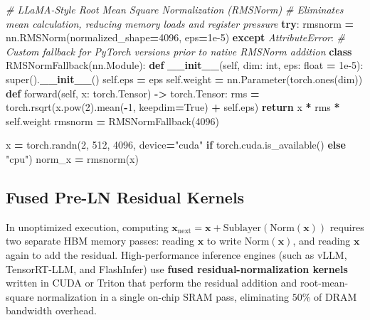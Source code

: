 \documentclass[
  letterpaper,
]{scrbook}
\newenvironment{Shaded}{\begin{snugshade}}{\end{snugshade}}
\newcommand{\BuiltInTok}[1]{#1}
\newcommand{\CommentTok}[1]{\textcolor[rgb]{0.56,0.35,0.01}{\textit{#1}}}
\newcommand{\ControlFlowTok}[1]{\textcolor[rgb]{0.13,0.29,0.53}{\textbf{#1}}}
\newcommand{\DecValTok}[1]{\textcolor[rgb]{0.00,0.00,0.81}{#1}}
\newcommand{\FloatTok}[1]{\textcolor[rgb]{0.00,0.00,0.81}{#1}}
\newcommand{\FunctionTok}[1]{\textcolor[rgb]{0.13,0.29,0.53}{\textbf{#1}}}
\newcommand{\KeywordTok}[1]{\textcolor[rgb]{0.13,0.29,0.53}{\textbf{#1}}}
\newcommand{\NormalTok}[1]{#1}
\newcommand{\OperatorTok}[1]{\textcolor[rgb]{0.81,0.36,0.00}{\textbf{#1}}}
\newcommand{\PreprocessorTok}[1]{\textcolor[rgb]{0.56,0.35,0.01}{\textit{#1}}}
\newcommand{\StringTok}[1]{\textcolor[rgb]{0.31,0.60,0.02}{#1}}
\newcommand{\VariableTok}[1]{\textcolor[rgb]{0.00,0.00,0.00}{#1}}
\begin{document}
\begin{tcolorbox}
\begin{Shaded}
\begin{Highlighting}[]
\CommentTok{\# LLaMA{-}Style Root Mean Square Normalization (RMSNorm)}
\CommentTok{\# Eliminates mean calculation, reducing memory loads and register pressure}
\ControlFlowTok{try}\NormalTok{:}
\NormalTok{    rmsnorm }\OperatorTok{=}\NormalTok{ nn.RMSNorm(normalized\_shape}\OperatorTok{=}\DecValTok{4096}\NormalTok{, eps}\OperatorTok{=}\FloatTok{1e{-}5}\NormalTok{)}
\ControlFlowTok{except} \PreprocessorTok{AttributeError}\NormalTok{:}
    \CommentTok{\# Custom fallback for PyTorch versions prior to native RMSNorm addition}
    \KeywordTok{class}\NormalTok{ RMSNormFallback(nn.Module):}
        \KeywordTok{def} \FunctionTok{\_\_init\_\_}\NormalTok{(}\VariableTok{self}\NormalTok{, dim: }\BuiltInTok{int}\NormalTok{, eps: }\BuiltInTok{float} \OperatorTok{=} \FloatTok{1e{-}5}\NormalTok{):}
            \BuiltInTok{super}\NormalTok{().}\FunctionTok{\_\_init\_\_}\NormalTok{()}
            \VariableTok{self}\NormalTok{.eps }\OperatorTok{=}\NormalTok{ eps}
            \VariableTok{self}\NormalTok{.weight }\OperatorTok{=}\NormalTok{ nn.Parameter(torch.ones(dim))}
        \KeywordTok{def}\NormalTok{ forward(}\VariableTok{self}\NormalTok{, x: torch.Tensor) }\OperatorTok{{-}\textgreater{}}\NormalTok{ torch.Tensor:}
\NormalTok{            rms }\OperatorTok{=}\NormalTok{ torch.rsqrt(x.}\BuiltInTok{pow}\NormalTok{(}\DecValTok{2}\NormalTok{).mean(}\OperatorTok{{-}}\DecValTok{1}\NormalTok{, keepdim}\OperatorTok{=}\VariableTok{True}\NormalTok{) }\OperatorTok{+} \VariableTok{self}\NormalTok{.eps)}
            \ControlFlowTok{return}\NormalTok{ x }\OperatorTok{*}\NormalTok{ rms }\OperatorTok{*} \VariableTok{self}\NormalTok{.weight}
\NormalTok{    rmsnorm }\OperatorTok{=}\NormalTok{ RMSNormFallback(}\DecValTok{4096}\NormalTok{)}

\NormalTok{x }\OperatorTok{=}\NormalTok{ torch.randn(}\DecValTok{2}\NormalTok{, }\DecValTok{512}\NormalTok{, }\DecValTok{4096}\NormalTok{, device}\OperatorTok{=}\StringTok{"cuda"} \ControlFlowTok{if}\NormalTok{ torch.cuda.is\_available() }\ControlFlowTok{else} \StringTok{"cpu"}\NormalTok{)}
\NormalTok{norm\_x }\OperatorTok{=}\NormalTok{ rmsnorm(x)}
\end{Highlighting}
\end{Shaded}

\subsection{Fused Pre-LN Residual
Kernels}\label{fused-pre-ln-residual-kernels}

In unoptimized execution, computing
\(\mathbf{x}_{\text{next}} = \mathbf{x} + \text{Sublayer}(\text{Norm}(\mathbf{x}))\)
requires two separate HBM memory passes: reading \(\mathbf{x}\) to write
\(\text{Norm}(\mathbf{x})\), and reading \(\mathbf{x}\) again to add the
residual. High-performance inference engines (such as vLLM,
TensorRT-LLM, and FlashInfer) use \textbf{fused residual-normalization
kernels} written in CUDA or Triton that perform the residual addition
and root-mean-square normalization in a single on-chip SRAM pass,
eliminating \(50\%\) of DRAM bandwidth overhead.\footnotemark{}

\end{tcolorbox}
\end{document}
